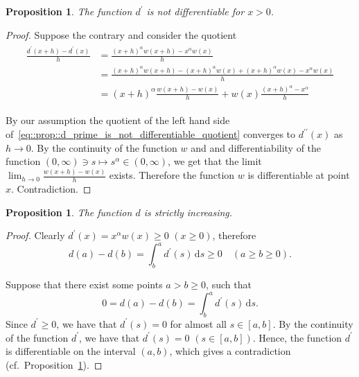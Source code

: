\documentclass[12pt]{article}
\newcommand{\dd}{\,\mathrm{d}}
\newcommand{\dprime}{{\prime\prime}}
\renewcommand{\geq}{\geqslant}
\newcommand{\mapto}{\longmapsto}
\newcommand{\paren}[1]{\! \left(#1 \right)}
\theoremstyle{plain}
\newtheorem{proposition}[theorem]{Proposition}
\theoremstyle{definition}
\theoremstyle{remark}
\begin{document}
\begin{proposition} \label{prop::d_prime_is_not_differentiable}
    The function $d^\prime$ is not differentiable for $x>0$.
 \end{proposition}
\begin{proof}
    Suppose the contrary and consider the quotient
    \begin{align} \label{eq::prop::d_prime_is_not_differentiable_quotient}
      \begin{split}
          \frac{d^\prime\paren{x+h} - d^\prime\paren{x}}{h} & = \frac{\paren{x+h}^\alpha w\paren{x+h} - x^\alpha w\paren{x}}{h} \\
                                                            & = \frac{\paren{x+h}^\alpha w\paren{x+h} - \paren{x+h}^\alpha w\paren{x} + \paren{x+h}^\alpha w\paren{x} - x^\alpha w\paren{x}}{h} \\
                                                            & = \paren{x+h}^\alpha \frac{w\paren{x+h} - w\paren{x}}{h} + w\paren{x} \frac{\paren{x+h}^\alpha - x^\alpha}{h}
      \end{split}
    \end{align}

    By our assumption the quotient of the left hand side of~\eqref{eq::prop::d_prime_is_not_differentiable_quotient} converges to $d^\dprime\paren{x}$ as $h \to 0$.
    By the continuity of the function $w$ and and differentiability of the function $\paren{0, \infty} \ni s \mapto s^\alpha \in \paren{0, \infty}$, we get that the limit $\lim_{h \to 0} \frac{w\paren{x+h}-w\paren{x}}{h}$ exists.
    Therefore the function $w$ is differentiable at point $x$.
    Contradiction.
\end{proof}

\begin{proposition} \label{prop::d_is_increasing}
    The function $d$ is strictly increasing.
\end{proposition}
\begin{proof}
    Clearly $d^\prime\paren{x} =x^\alpha w\paren{x} \geq 0$ $\paren{x \geq 0}$, therefore
    \begin{equation*} %
        d\paren{a} - d\paren{b} = \int^a_b d^\prime\paren{s} \dd s \geq 0 \quad \paren{a \geq b \geq 0}.
    \end{equation*}

    Suppose that there exist some points $a > b \geq 0$, such that
    \begin{equation*}
        0 = d\paren{a} - d\paren{b} = \int^a_b d^\prime\paren{s} \dd s.
    \end{equation*}
    Since $d^\prime \geq 0$, we have that $d^\prime\paren{s} = 0$ for almost all $s \in \left[a, b\right]$.
    By the continuity of the function $d^\prime$, we have that $d^\prime\paren{s} = 0$ $\paren{s \in  \left[a, b\right]}$.
    Hence, the function $d^\prime$ is differentiable on the interval $\paren{a, b}$, which gives a contradiction (cf.\ Proposition~\ref{prop::d_prime_is_not_differentiable}).
\end{proof}
\end{document}
